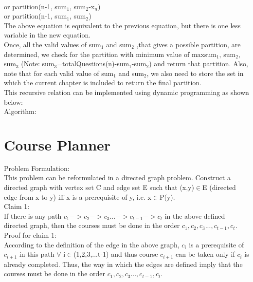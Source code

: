 \documentclass{article}
\begin{document}
\\\indent  \hspace{3.8cm}or partition(n-1, sum$_{1}$, sum$_{2}$-x$_{n}$) 
\\\indent  \hspace{3.8cm}or partition(n-1, sum$_{1}$, sum$_{2}$)
\\
The above equation is equivalent to the previous equation, but there is one less variable in the new equation.
\\
Once, all the valid values of sum$_{1}$ and sum$_{2}$ ,that gives a possible partition, are determined, we check for the partition with minimum value of max{sum$_{1}$, sum$_{2}$, sum$_{3}$} (Note: sum$_{3}$=totalQuestions(n)-sum$_{1}$-sum$_{2}$) and return that partition. Also, note that for each valid value of sum$_{1}$ and sum$_{2}$, we also need to store the set in which the current chapter is included to return the final partition.
\\
This recursive relation can be implemented using dynamic programming as shown below:
\\
Algorithm:


\section{Course Planner}
Problem Formulation:\\
This problem can be reformulated in a directed graph problem. Construct a directed graph with vertex set C and edge set E such that (x,y)$\in$E (directed edge from x to y) iff x is a prerequisite of y, i.e. x$\in$P(y).\\
Claim 1:\\
If there is any path $c_1->c_2->c_3...->c_{t-1}->c_t$ in the above defined directed graph, then the courses must be done in the order $c_1, c_2, c_3..., c_{t-1}, c_t$.
\\
Proof for claim 1:\\
According to the definition of the edge in the above graph, $c_i$ is a prerequisite of $c_{i+1}$ in this path $\forall$ i$\in$(1,2,3,...t-1) and thus course $c_{i+1}$ can be taken only if $c_i$ is already completed. Thus, the way in which the edges are defined imply that the courses must be done in the order $c_1, c_2, c_3..., c_{t-1}, c_t$.
\end{document}
